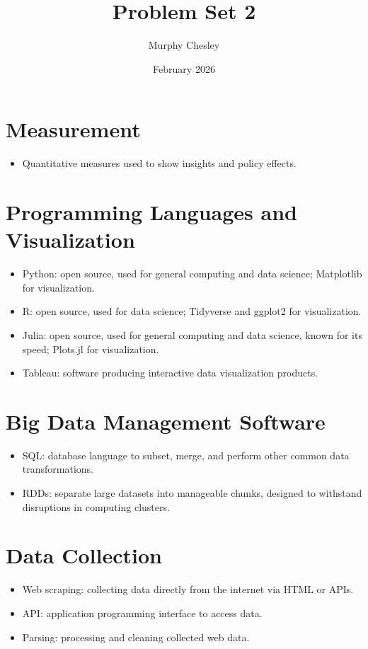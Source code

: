 \documentclass{article}
\title{Problem Set 2}
\author{Murphy Chesley}
\date{February 2026}
\begin{document}
\maketitle


\section{Measurement}
\begin{itemize}
    \item Quantitative measures used to show insights and policy effects.
\end{itemize}

\section{Programming Languages and Visualization}
\begin{itemize}
    \item Python: open source, used for general computing and data science; Matplotlib for visualization.
    \item R: open source, used for data science; Tidyverse and ggplot2 for visualization.
    \item Julia: open source, used for general computing and data science, known for its speed; Plots.jl for visualization.
    \item Tableau: software producing interactive data visualization products.
\end{itemize}

\section{Big Data Management Software}
\begin{itemize}
    \item SQL: database language to subset, merge, and perform other common data transformations.
    \item RDDs: separate large datasets into manageable chunks, designed to withstand disruptions in computing clusters.
\end{itemize}

\section{Data Collection}
\begin{itemize}
    \item Web scraping: collecting data directly from the internet via HTML or APIs.
    \item API: application programming interface to access data.
    \item Parsing: processing and cleaning collected web data.
\end{itemize}
\end{document}
